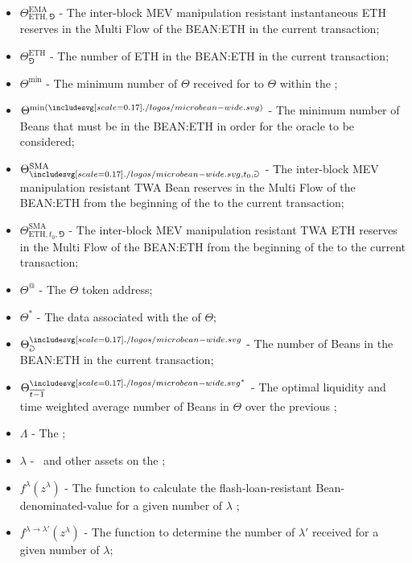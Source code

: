 \documentclass[class=article, crop=false]{standalone}
\begin{document}
\begin{itemize}[topsep=0pt, itemsep=3pt,leftmargin=16pt]
    \item[] $\Theta^{\text{EMA}}_{\text{ETH},\Game}$ - The inter-block MEV manipulation resistant instantaneous ETH reserves in the Multi Flow  of the BEAN:ETH  in the current transaction;
    \item[] $\Theta_{\Game}^{\text{ETH}}$ - The number of ETH in the BEAN:ETH  in the current transaction;
    \item[] $\Theta^{\text{min}}$ - The minimum number of $\Theta$ received for  to  $\Theta$ within the ;
    \item[] $\Theta^{\text{min}(\bean)}$ - The minimum number of Beans that must be in the BEAN:ETH  in order for the oracle to be considered;
    \item[] $\Theta^{\text{SMA}}_{\bean,t_0,\Game}$ - The inter-block MEV manipulation resistant TWA Bean reserves in the Multi Flow  of the BEAN:ETH  from the beginning of the  to the current transaction;
    \item[] $\Theta^{\text{SMA}}_{\text{ETH},t_0,\Game}$ - The inter-block MEV manipulation resistant TWA ETH reserves in the Multi Flow  of the BEAN:ETH  from the beginning of the  to the current transaction;
    \item[] $\Theta^{@}$ - The $\Theta$ token address;
    \item[] $\Theta^{*}$ - The data associated with the  of $\Theta$;
    \item[] $\Theta_{\Game}^{\bean}$ - The number of Beans in the BEAN:ETH  in the current transaction;
    \item[] $\Theta_{\overline{t-1}}^{{\bean}^*}$ - The optimal liquidity and time weighted average number of Beans in $\Theta$ over the previous ;
    \item[] $\Lambda$ - \hypertarget{ht127}{The };
    \item[] $\lambda$ - \hypertarget{ht126}{\Bean\ and other assets on the };
    \item[] $f^{\lambda}(z^{\lambda})$ - \hypertarget{ht84}{The function to calculate the flash-loan-resistant Bean-denominated-value for a given number of $\lambda$ };
    \item[] $f^{\lambda \rightarrow \lambda'}(z^{\lambda})$ - \hypertarget{ht83}{The function to determine the number of $\lambda'$ received for  a given number of $\lambda$};

\end{itemize}
\end{document}
